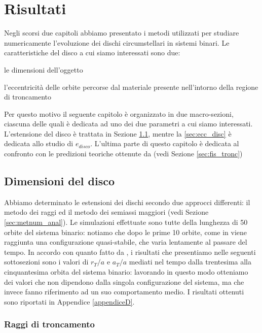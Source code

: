 \chapter{Risultati}

Negli scorsi due capitoli abbiamo presentato i metodi utilizzati per studiare numericamente l'evoluzione dei dischi circumstellari in sistemi binari.
Le caratteristiche del disco a cui siamo interessati sono due:
\begin{list}{\textbf{-}}{\setlength{\itemsep}{0cm}}
    \item le dimensioni dell'oggetto
    \item l'eccentricità delle orbite percorse dal materiale presente nell'intorno della regione di troncamento
\end{list}
Per questo motivo il seguente capitolo è organizzato in due macro-sezioni, ciascuna delle quali è dedicata ad uno dei due parametri a cui siamo interessati.
L'estensione del disco è trattata in Sezione \ref{sec:dim_disc}, mentre la \ref{sec:ecc_disc} è dedicata allo studio di $e_{disco}$.
L'ultima parte di questo capitolo è dedicata al confronto con le predizioni teoriche ottenute da \textcite{ManaraTronc2019} (vedi Sezione \ref{sec:fis_tronc})

\section{Dimensioni del disco} \label{sec:dim_disc}

Abbiamo determinato le estensioni dei dischi secondo due approcci differenti: il metodo dei raggi ed il metodo dei semiassi maggiori (vedi Sezione \ref{sec:metnum_anal}).
Le simulazioni effettuate sono tutte della lunghezza di 50 orbite del sistema binario: notiamo che dopo le prime 10 orbite, come in \textcite{ArtymowiczLubow1994} viene raggiunta una configurazione quasi-stabile, che varia lentamente al passare del tempo.
In accordo con quanto fatto da \textcite{ArtymowiczLubow1994}, i risultati che presentiamo nelle seguenti sottosezioni sono i valori di $r_T/a$ e $a_T/a$ mediati nel tempo dalla trentesima alla cinquantesima orbita del sistema binario: lavorando in questo modo otteniamo dei valori che non dipendono dalla singola configurazione del sistema, ma che invece fanno riferimento ad un suo comportamento medio.
I risultati ottenuti sono riportati in Appendice \ref{appendiceD}.

\subsection{Raggi di troncamento}

